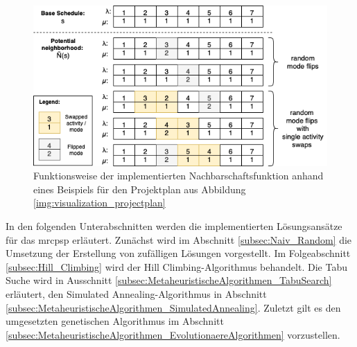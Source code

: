\begin{figure}[H]
    \centering
    \includegraphics[width=0.84\linewidth]{assets/img/04_Umsetzung/MRCPSPNeighhbourhood.drawio.png}
    \caption{Funktionsweise der implementierten Nachbarschaftsfunktion anhand eines Beispiels für den Projektplan aus Abbildung \ref{img:visualization_projectplan}} 
    \label{img:implementation_neighbourhood}
\end{figure}

In den folgenden Unterabschnitten werden die implementierten Lösungsansätze für das \ac{mrcpsp} erläutert. Zunächst wird im Abschnitt \ref{subsec:Naiv_Random} die Umsetzung der Erstellung von zufälligen Lösungen vorgestellt. Im Folgeabschnitt \ref{subsec:Hill_Climbing} wird der Hill Climbing-Algorithmus behandelt. Die Tabu Suche wird in Ausschnitt \ref{subsec:MetaheuristischeAlgorithmen_TabuSearch} erläutert, den Simulated Annealing-Algorithmus in Abschnitt \ref{subsec:MetaheuristischeAlgorithmen_SimulatedAnnealing}. Zuletzt gilt es den umgesetzten genetischen Algorithmus im Abschnitt \ref{subsec:MetaheuristischeAlgorithmen_EvolutionaereAlgorithmen} vorzustellen.






